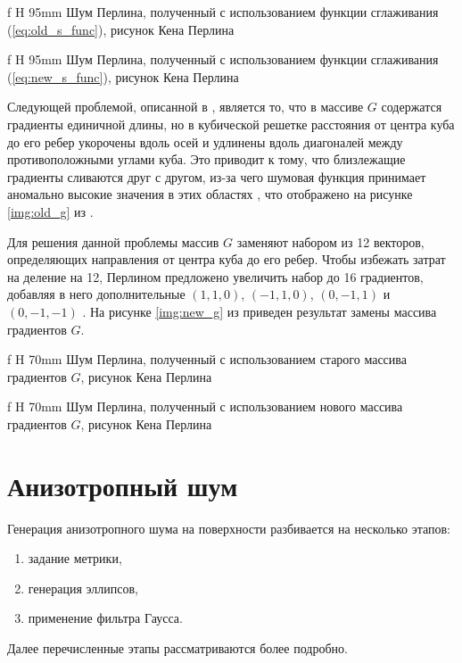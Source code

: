  {f} {H} {95mm}%
{Шум Перлина, полученный с использованием функции сглаживания (\ref{eq:old_s_func}), рисунок Кена Перлина \cite{impperlin}}

 {f} {H} {95mm}%
{Шум Перлина, полученный с использованием функции сглаживания (\ref{eq:new_s_func}), рисунок Кена Перлина \cite{impperlin}}

Следующей проблемой, описанной в \cite{impperlin}, является то, что в массиве $G$ содержатся градиенты единичной длины, но в кубической решетке расстояния от центра куба до его ребер укорочены вдоль осей и удлинены вдоль диагоналей между противоположными углами куба. 
Это приводит к тому, что близлежащие градиенты сливаются друг с другом, из-за чего шумовая функция принимает аномально высокие значения в этих областях \cite{impperlin}, что отображено на рисунке \ref{img:old_g} из \cite{impperlin}. 

Для решения данной проблемы массив $G$ заменяют набором из 12 векторов, определяющих направления от центра куба до его ребер. 
Чтобы избежать затрат на деление на 12, Перлином предложено увеличить набор до 16 градиентов, добавляя в него дополнительные $(1,1,0)$, $(-1,1,0)$, $(0,-1,1)$ и $(0,-1,-1)$ \cite{impperlin}. 
На рисунке \ref{img:new_g} из \cite{impperlin} приведен результат замены массива градиентов $G$.

 {f} {H} {70mm}%
{Шум Перлина, полученный с использованием старого массива градиентов $G$, рисунок Кена Перлина \cite{impperlin}}

 {f} {H} {70mm}%
{Шум Перлина, полученный с использованием нового массива градиентов $G$, рисунок Кена Перлина \cite{impperlin}}

\section{Анизотропный шум}

Генерация анизотропного шума \cite{feng2008anisotropic} на поверхности разбивается на несколько этапов:
\begin{enumerate}
	\item задание метрики,
	\item генерация эллипсов,
	\item применение фильтра Гаусса.
\end{enumerate}

Далее перечисленные этапы рассматриваются более подробно.


